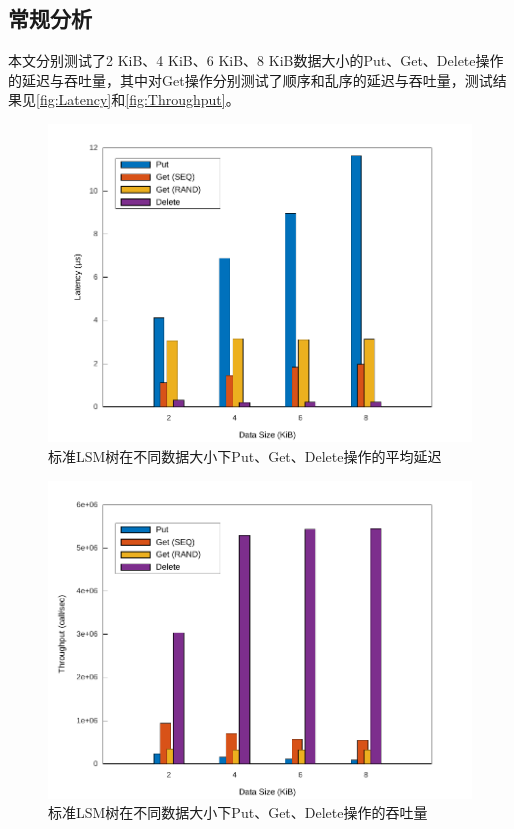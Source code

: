\documentclass[a4paper,UTF8]{ctexart}
\begin{document}
\subsection{常规分析}
本文分别测试了2 KiB、4 KiB、6 KiB、8 KiB数据大小的Put、Get、Delete操作的延迟与吞吐量，其中对Get操作分别测试了顺序和乱序的延迟与吞吐量，测试结果见\autoref{fig:Latency}和\autoref{fig:Throughput}。

\begin{figure}[htbp]
	\centering
	\includegraphics[width=.6\textwidth]{latency.pdf}
	\caption{标准LSM树在不同数据大小下Put、Get、Delete操作的平均延迟}
	\label{fig:Latency}
\end{figure}
\begin{figure}[htbp]
	\centering
	\includegraphics[width=.6\textwidth]{throughput.pdf}
	\caption{标准LSM树在不同数据大小下Put、Get、Delete操作的吞吐量}
	\label{fig:Throughput}
\end{figure}
\end{document}
